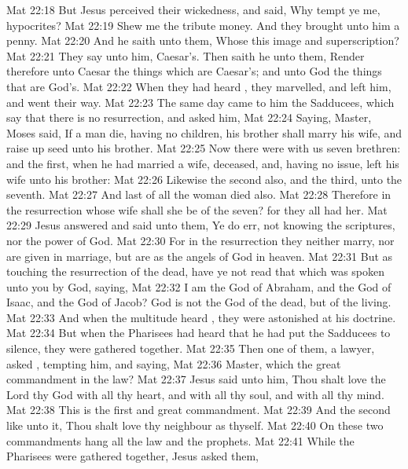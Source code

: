 \vs Mat 22:18 But Jesus perceived their wickedness, and said, Why tempt ye me,  hypocrites?
\vs Mat 22:19 Shew me the tribute money. And they brought unto him a penny.
\vs Mat 22:20 And he saith unto them, Whose  this image and superscription?
\vs Mat 22:21 They say unto him, Caesar's. Then saith he unto them, Render therefore unto Caesar the things which are Caesar's; and unto God the things that are God's.
\vs Mat 22:22 When they had heard , they marvelled, and left him, and went their way.
\vs Mat 22:23 The same day came to him the Sadducees, which say that there is no resurrection, and asked him,
\vs Mat 22:24 Saying, Master, Moses said, If a man die, having no children, his brother shall marry his wife, and raise up seed unto his brother.
\vs Mat 22:25 Now there were with us seven brethren: and the first, when he had married a wife, deceased, and, having no issue, left his wife unto his brother:
\vs Mat 22:26 Likewise the second also, and the third, unto the seventh.
\vs Mat 22:27 And last of all the woman died also.
\vs Mat 22:28 Therefore in the resurrection whose wife shall she be of the seven? for they all had her.
\vs Mat 22:29 Jesus answered and said unto them, Ye do err, not knowing the scriptures, nor the power of God.
\vs Mat 22:30 For in the resurrection they neither marry, nor are given in marriage, but are as the angels of God in heaven.
\vs Mat 22:31 But as touching the resurrection of the dead, have ye not read that which was spoken unto you by God, saying,
\vs Mat 22:32 I am the God of Abraham, and the God of Isaac, and the God of Jacob? God is not the God of the dead, but of the living.
\vs Mat 22:33 And when the multitude heard , they were astonished at his doctrine.
\vs Mat 22:34 But when the Pharisees had heard that he had put the Sadducees to silence, they were gathered together.
\vs Mat 22:35 Then one of them,  a lawyer, asked , tempting him, and saying,
\vs Mat 22:36 Master, which  the great commandment in the law?
\vs Mat 22:37 Jesus said unto him, Thou shalt love the Lord thy God with all thy heart, and with all thy soul, and with all thy mind.
\vs Mat 22:38 This is the first and great commandment.
\vs Mat 22:39 And the second  like unto it, Thou shalt love thy neighbour as thyself.
\vs Mat 22:40 On these two commandments hang all the law and the prophets.
\vs Mat 22:41 While the Pharisees were gathered together, Jesus asked them,
